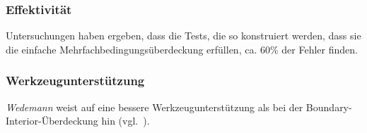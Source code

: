 \subsubsection*{Effektivität}
Untersuchungen haben ergeben, dass die Tests, die so konstruiert werden, dass sie die einfache Mehrfachbedingungsüberdeckung  erfüllen, ca. 60\% der Fehler finden.

\subsubsection*{Werkzeugunterstützung}
\textit{Wedemann} weist auf eine bessere Werkzeugunterstützung als bei der Boundary-Interior-Überdeckung hin (vgl.~\cite[53]{Wed09c}).